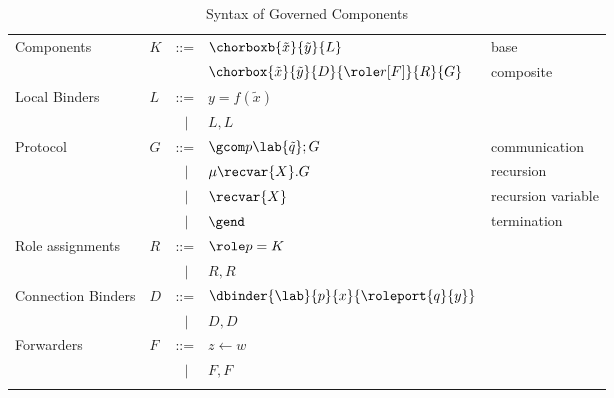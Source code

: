 \begin{table}[t]
    \centering
    \begin{tabular}{l l l l l}
    Components & $K$  & ::=& 
    $\chorboxb {\tilde x}{\tilde y}{L}$
    & base\\
         &     &    & $\chorbox{\tilde x}{\tilde y}{D}{\role r[F]}{R}{G}$ & composite\\
    
    
    
    Local Binders & $L$ & ::=& $y=f(\tilde{x})$ & \\
    & & $\ \ \ |$ & $L,L$ & \\
    
    Protocol  & $G$ & ::=& $\gcom p \lab{\tilde  q};G$ & communication\\
    & & $\ \ \ |$ & $\mu \recvar{X}.G$ & recursion\\
    & & $\ \ \ |$ & $\recvar{X}$ & recursion variable \\
    & & $\ \ \ |$ & $\gend$ & termination\\
    
    
    Role assignments &  $R$ &::= & $\role p=K$ & \\
    & & $\ \ \ |$ & $R,R$ & \\
    
    
   Connection Binders  & $D$ & ::=& $\dbinder{\lab}{p}{x} {\roleport{q}{y}}$ & \\
    & & $\ \ \ |$ & $D,D$ & \\
    
   
   
   Forwarders  & $F$ &::= & $z\leftarrow w $ & \\
   & & $\ \ \ |$ & $F,F$ &\\
   & & & & \\
   
    \end{tabular}\\
    
    \caption{Syntax of Governed Components}
    
    \label{syntaxcomponents}
    
\end{table}


